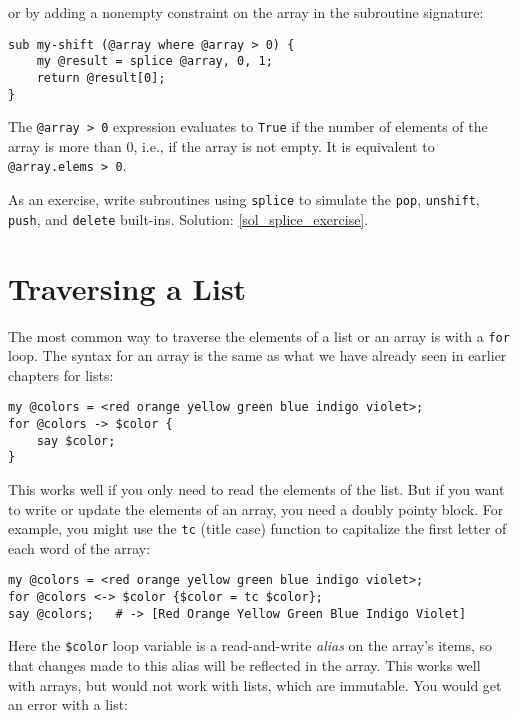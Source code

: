 or by adding a nonempty constraint on the array in the 
subroutine signature:

\begin{verbatim}
sub my-shift (@array where @array > 0) {
    my @result = splice @array, 0, 1;
    return @result[0];
}    
\end{verbatim}
%

The \verb'@array > 0' expression evaluates to {\tt True} if 
the number of elements of the array is more than 0, i.e., if the 
array is not empty. It is equivalent to \verb'@array.elems > 0'.

\label{splice_exercise}
As an exercise, write subroutines using  \verb'splice' to 
simulate the {\tt pop}, {\tt unshift}, {\tt push}, and 
{\tt delete} built-ins. Solution: \ref{sol_splice_exercise}.


\section{Traversing a List}

The most common way to traverse the elements of a list or an 
array is with a {\tt for} loop.  The syntax for an array is 
the same as what we have already seen in earlier chapters 
for lists:

\begin{verbatim}
my @colors = <red orange yellow green blue indigo violet>;
for @colors -> $color {
    say $color;
}
\end{verbatim}
%
This works well if you only need to read the elements of the
list.  But if you want to write or update the elements of an array, you
need a doubly pointy block. For example, you might use the 
{\tt tc} (title case) function to capitalize the first letter 
of each word of the array:

\begin{verbatim}
my @colors = <red orange yellow green blue indigo violet>;
for @colors <-> $color {$color = tc $color};
say @colors;   # -> [Red Orange Yellow Green Blue Indigo Violet]
\end{verbatim}
%
Here the \verb'$color' loop variable is a read-and-write \emph{alias} 
on the array's items, so that changes made to this alias will 
be reflected in the array. This works well with arrays, but 
would not work with lists, which are immutable. You would 
get an error with a list:

